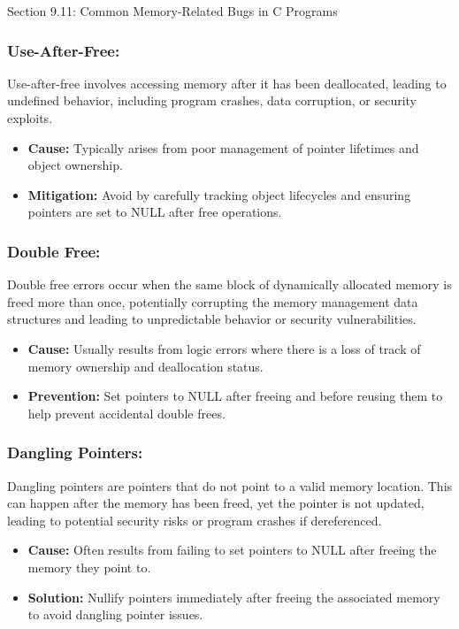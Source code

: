 \begin{notes}{Section 9.11: Common Memory-Related Bugs in C Programs}
    \subsubsection*{Use-After-Free:}
    
    Use-after-free involves accessing memory after it has been deallocated, leading to undefined behavior, including program crashes, data corruption, or security exploits.
    
    \begin{itemize}
        \item \textbf{Cause:} Typically arises from poor management of pointer lifetimes and object ownership.
        \item \textbf{Mitigation:} Avoid by carefully tracking object lifecycles and ensuring pointers are set to NULL after free operations.
    \end{itemize}
    
    \subsubsection*{Double Free:}
    
    Double free errors occur when the same block of dynamically allocated memory is freed more than once, potentially corrupting the memory management data structures and leading to unpredictable 
    behavior or security vulnerabilities.
    
    \begin{itemize}
        \item \textbf{Cause:} Usually results from logic errors where there is a loss of track of memory ownership and deallocation status.
        \item \textbf{Prevention:} Set pointers to NULL after freeing and before reusing them to help prevent accidental double frees.
    \end{itemize}
    
    \subsubsection*{Dangling Pointers:}
    
    Dangling pointers are pointers that do not point to a valid memory location. This can happen after the memory has been freed, yet the pointer is not updated, leading to potential security risks 
    or program crashes if dereferenced.
    
    \begin{itemize}
        \item \textbf{Cause:} Often results from failing to set pointers to NULL after freeing the memory they point to.
        \item \textbf{Solution:} Nullify pointers immediately after freeing the associated memory to avoid dangling pointer issues.
    \end{itemize}
    

\end{notes}
